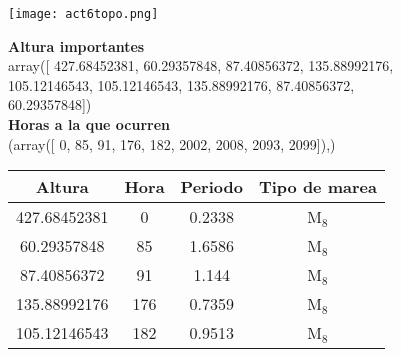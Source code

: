 \documentclass[a4paper,12pt]{article}
\begin{document}
\begin{center}
\texttt{[image: act6topo.png]}
\end{center}
\noindent
\textbf{Altura importantes}\\
\noindent
array([ 427.68452381,   60.29357848,   87.40856372,  135.88992176,\\
        105.12146543,  105.12146543,  135.88992176,   87.40856372,\\
         60.29357848])\\
\textbf{Horas a la que ocurren}\\         
\noindent
(array([   0,   85,   91,  176,  182, 2002, 2008, 2093, 2099]),)

\begin{center}
\begin{tabular}{|c|c|c|c|}
\hline
Altura & Hora & Periodo & Tipo de marea \\ \hline
427.68452381 & 0 & 0.2338 & M$_8$\\ \hline
60.29357848 & 85 &1.6586 &M$_8$\\ \hline
87.40856372 & 91 &1.144 &M$_8$\\ \hline
135.88992176 & 176 &0.7359 &M$_8$\\ \hline
105.12146543 & 182 &0.9513 &M$_8$\\ \hline
\end{tabular}
\end{center}
\end{document}
